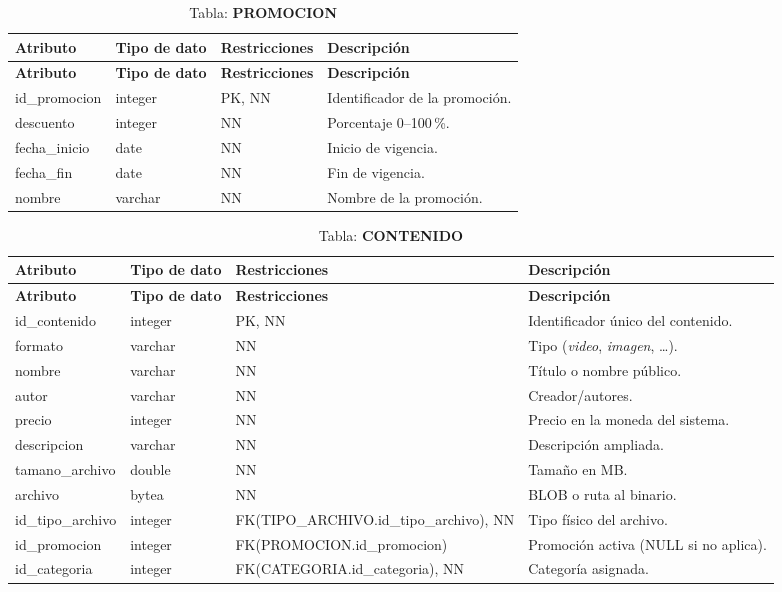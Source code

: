 \begin{longtable}{|l|l|p{5cm}|p{5cm}|}
\caption{Tabla: \textbf{PROMOCION}}\\ \hline
\textbf{Atributo} & \textbf{Tipo de dato} & \textbf{Restricciones} & \textbf{Descripción} \\ \hline
\endfirsthead
\hline \textbf{Atributo} & \textbf{Tipo de dato} & \textbf{Restricciones} & \textbf{Descripción} \\ \hline
\endhead
id\_promocion & integer & PK, NN & Identificador de la promoción. \\ \hline
descuento     & integer & NN & Porcentaje 0–100\,\%. \\ \hline
fecha\_inicio & date    & NN & Inicio de vigencia. \\ \hline
fecha\_fin    & date    & NN & Fin de vigencia. \\ \hline
nombre        & varchar & NN & Nombre de la promoción. \\ \hline
\end{longtable}

\begin{longtable}{|l|l|p{5cm}|p{5cm}|}
\caption{Tabla: \textbf{CONTENIDO}}\\ \hline
\textbf{Atributo} & \textbf{Tipo de dato} & \textbf{Restricciones} & \textbf{Descripción} \\ \hline
\endfirsthead
\hline \textbf{Atributo} & \textbf{Tipo de dato} & \textbf{Restricciones} & \textbf{Descripción} \\ \hline
\endhead
id\_contenido   & integer & PK, NN & Identificador único del contenido. \\ \hline
formato         & varchar & NN     & Tipo (\textit{video}, \textit{imagen}, …). \\ \hline
nombre          & varchar & NN     & Título o nombre público. \\ \hline
autor           & varchar & NN     & Creador/autores. \\ \hline
precio          & integer & NN     & Precio en la moneda del sistema. \\ \hline
descripcion     & varchar & NN     & Descripción ampliada. \\ \hline
tamano\_archivo & double  & NN     & Tamaño en MB. \\ \hline
archivo         & bytea   & NN     & BLOB o ruta al binario. \\ \hline
id\_tipo\_archivo& integer & FK(TIPO\_ARCHIVO.id\_tipo\_archivo), NN & Tipo físico del archivo. \\ \hline
id\_promocion   & integer & FK(PROMOCION.id\_promocion) & Promoción activa (NULL si no aplica). \\ \hline
id\_categoria   & integer & FK(CATEGORIA.id\_categoria), NN & Categoría asignada. \\ \hline
\end{longtable}

